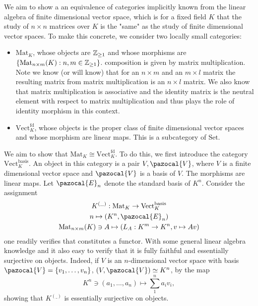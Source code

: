     \begin{example}
        We aim to show a an equivalence of categories implicitly known from the linear algebra of finite dimensional vector space, which is for a fixed field $K$ that the study of $n\times n$ matrices over $K$ is the "same" as the study of finite dimensional vector spaces. To make this concrete, we consider two locally small categories:
        \begin{itemize}
            \item $\mathrm{Mat}_K$, whose objects are $\mathbb{Z}_{\geq 1}$ and whose morphisms are $\{\mathrm{Mat}_{n\times m}(K) : n,m\in \mathbb{Z}_{\geq 1}\}$. composition is given by matrix multiplication. Note we know (or will know) that for an $n\times m$ and an $m\times l$ matrix the resulting matrix from matrix multiplication is an $n\times l$ matrix. We also know that matrix multiplication is associative and the identity matrix is the neutral element with respect to matrix multiplication and thus plays the role of identity morphism in this context.
            \item $\mathrm{Vect}^{\mathrm{fd}}_K$, whose objects is the proper class of finite dimensional vector spaces and whose morphism are linear maps. This is a subcategory of $\mathrm{Set}$.  
        \end{itemize}    
        We aim to show that $\mathrm{Mat}_K\cong \mathrm{Vect}^{\mathrm{fd}}_K$. To do this, we first introduce the category $\mathrm{Vect}_K^{\mathrm{basis}}$. An object in this category is a pair $V,\pazocal{V}$, where $V$ is a finite dimensional vector space and $\pazocal{V}$ is a basis of $V$. The morphisms are linear maps. Let $\pazocal{E}_n$ denote the standard basis of $K^n$. Consider the assignment
        \begin{gather*}
            K^{(\_)} : \mathrm{Mat}_K \rightarrow \mathrm{Vect}^{\mathrm{basis}}_K\\
            n \mapsto (K^n,\pazocal{E}_n)\\
            \mathrm{Mat}_{n\times m}(K)\ni A \mapsto (L_A : K^m\rightarrow K^n, v\mapsto A v)
        \end{gather*}  
        one readily verifies that constitutes a functor. With some general linear algebra knowledge and it also easy to verify that it is fully faithful and essentially surjective on objects. Indeed, if $V$ is an $n$-dimensional vector space with basis $\pazocal{V}=\{v_1,\dots,v_n\}$, $(V,\pazocal{V})\simeq K^n$, by the map 
        $$K^n\ni (a_1,\dots,a_n)\mapsto \sum_1^n a_iv_i,$$
        showing that $K^{(\_)}$ is essentially surjective on objects.\\ 

\end{example}
